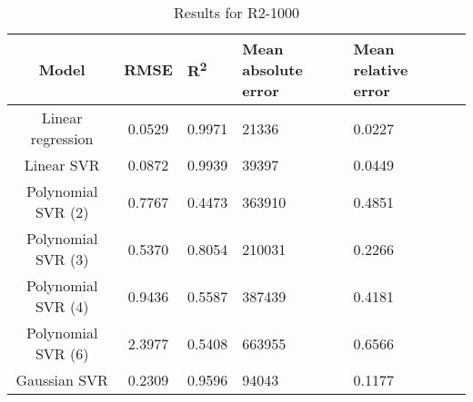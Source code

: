 \begin{table}[H]
\centering
\begin{adjustbox}{center}
\begin{tabular}{c | c M{1.2cm} M{2.5cm} M{2.5cm} M{1.8cm}}
Model & RMSE & R\textsuperscript{2} & Mean absolute error & Mean relative error \tabularnewline
\hline
Linear regression & 0.0529 & 0.9971 &  21336 & 0.0227 \\
Linear SVR & 0.0872 & 0.9939 &  39397 & 0.0449 \\
Polynomial SVR (2) & 0.7767 & 0.4473 & 363910 & 0.4851 \\
Polynomial SVR (3) & 0.5370 & 0.8054 & 210031 & 0.2266 \\
Polynomial SVR (4) & 0.9436 & 0.5587 & 387439 & 0.4181 \\
Polynomial SVR (6) & 2.3977 & 0.5408 & 663955 & 0.6566 \\
Gaussian SVR & 0.2309 & 0.9596 &  94043 & 0.1177 \\
\end{tabular}
\end{adjustbox}
\\
\caption{Results for R2-1000}
\label{tab:coreonly_linear_R2_1000}
\end{table}
